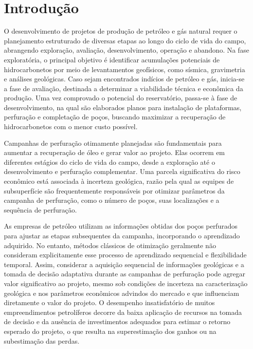 
\chapter{Introdução}

O desenvolvimento de projetos de produção de petróleo e gás natural requer o planejamento estruturado de diversas etapas ao longo do ciclo de vida do campo, abrangendo exploração, avaliação, desenvolvimento, operação e abandono. Na fase exploratória, o principal objetivo é identificar acumulações potenciais de hidrocarbonetos por meio de levantamentos geofísicos, como sísmica, gravimetria e análises geológicas. Caso sejam encontrados indícios de petróleo e gás, inicia-se a fase de avaliação, destinada a determinar a viabilidade técnica e econômica da produção. Uma vez comprovado o potencial do reservatório, passa-se à fase de desenvolvimento, na qual são elaborados planos para instalação de plataformas, perfuração e completação de poços, buscando maximizar a recuperação de hidrocarbonetos com o menor custo possível.

Campanhas de perfuração otimamente planejadas são fundamentais para aumentar a recuperação de óleo e gerar valor ao projeto. Elas ocorrem em diferentes estágios do ciclo de vida do campo, desde a exploração até o desenvolvimento e perfuração complementar. Uma parcela significativa do risco econômico está associada à incerteza geológica, razão pela qual as equipes de subsuperfície são frequentemente responsáveis por otimizar parâmetros da campanha de perfuração, como o número de poços, suas localizações e a sequência de perfuração.

As empresas de petróleo utilizam as informações obtidas dos poços perfurados para ajustar as etapas subsequentes da campanha, incorporando o aprendizado adquirido. No entanto, métodos clássicos de otimização geralmente não consideram explicitamente esse processo de aprendizado sequencial e flexibilidade temporal. Assim, considerar a aquisição sequencial de informações geológicas e a tomada de decisão adaptativa durante as campanhas de perfuração pode agregar valor significativo ao projeto, mesmo sob condições de incerteza na caracterização geológica e nos parâmetros econômicos advindos do mercado e que influenciam diretamente o valor do projeto. O desempenho insatisfatório de muitos empreendimentos petrolíferos decorre da baixa aplicação de recursos na tomada de decisão e da ausência de investimentos adequados para estimar o retorno esperado do projeto, o que resulta na superestimação dos ganhos ou na subestimação das perdas.

